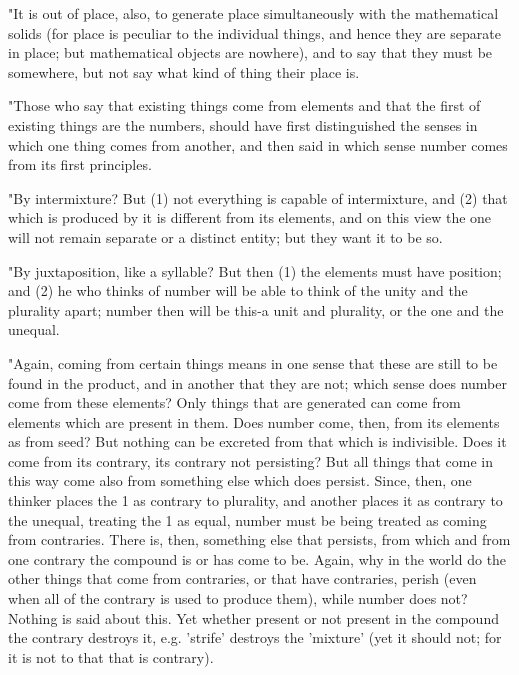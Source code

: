 "It is out of place, also, to generate place simultaneously with the
mathematical solids (for place is peculiar to the individual things,
and hence they are separate in place; but mathematical objects are
nowhere), and to say that they must be somewhere, but not say what
kind of thing their place is. 

"Those who say that existing things come from elements and that the
first of existing things are the numbers, should have first distinguished
the senses in which one thing comes from another, and then said in
which sense number comes from its first principles. 

"By intermixture? But (1) not everything is capable of intermixture,
and (2) that which is produced by it is different from its elements,
and on this view the one will not remain separate or a distinct entity;
but they want it to be so. 

"By juxtaposition, like a syllable? But then (1) the elements must
have position; and (2) he who thinks of number will be able to think
of the unity and the plurality apart; number then will be this-a unit
and plurality, or the one and the unequal. 

"Again, coming from certain things means in one sense that these are
still to be found in the product, and in another that they are not;
which sense does number come from these elements? Only things that
are generated can come from elements which are present in them. Does
number come, then, from its elements as from seed? But nothing can
be excreted from that which is indivisible. Does it come from its
contrary, its contrary not persisting? But all things that come in
this way come also from something else which does persist. Since,
then, one thinker places the 1 as contrary to plurality, and another
places it as contrary to the unequal, treating the 1 as equal, number
must be being treated as coming from contraries. There is, then, something
else that persists, from which and from one contrary the compound
is or has come to be. Again, why in the world do the other things
that come from contraries, or that have contraries, perish (even when
all of the contrary is used to produce them), while number does not?
Nothing is said about this. Yet whether present or not present in
the compound the contrary destroys it, e.g. 'strife' destroys the
'mixture' (yet it should not; for it is not to that that is contrary).


